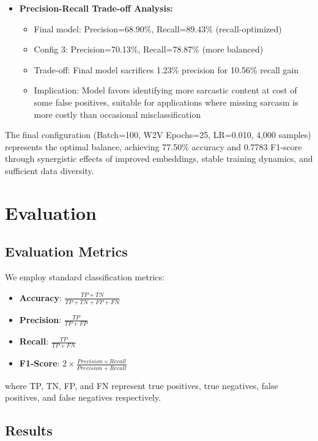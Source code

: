 \documentclass[11pt]{article}
\begin{document}
\begin{itemize}
    \item \textbf{Precision-Recall Trade-off Analysis:}
    \begin{itemize}
        \item Final model: Precision=68.90\%, Recall=89.43\% (recall-optimized)
        \item Config 3: Precision=70.13\%, Recall=78.87\% (more balanced)
        \item Trade-off: Final model sacrifices 1.23\% precision for 10.56\% recall gain
        \item Implication: Model favors identifying more sarcastic content at cost of some false positives, suitable for applications where missing sarcasm is more costly than occasional misclassification
    \end{itemize}
\end{itemize}

The final configuration (Batch=100, W2V Epochs=25, LR=0.010, 4,000 samples) represents the optimal balance, achieving 77.50\% accuracy and 0.7783 F1-score through synergistic effects of improved embeddings, stable training dynamics, and sufficient data diversity.

\section{Evaluation}

\subsection{Evaluation Metrics}

We employ standard classification metrics:

\begin{itemize}
    \item \textbf{Accuracy}: $\frac{TP + TN}{TP + TN + FP + FN}$
    \item \textbf{Precision}: $\frac{TP}{TP + FP}$
    \item \textbf{Recall}: $\frac{TP}{TP + FN}$
    \item \textbf{F1-Score}: $2 \times \frac{Precision \times Recall}{Precision + Recall}$
\end{itemize}

where TP, TN, FP, and FN represent true positives, true negatives, false positives, and false negatives respectively.

\subsection{Results}
\end{document}
